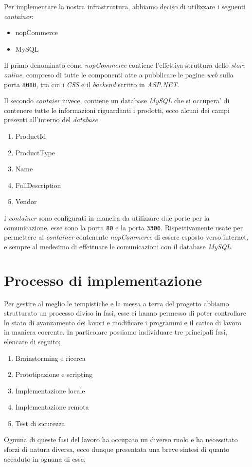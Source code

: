 \documentclass[a4paper]{report}
\begin{document}
		Per implementare la nostra infrastruttura, abbiamo deciso di utilizzare i seguenti \emph{container}:
		\begin{itemize}
			\item nopCommerce
			\item MySQL
		\end{itemize}
		Il primo denominato come \emph{nopCommerce} contiene l'effettiva struttura dello \emph{store online}, compreso
		di tutte le componenti atte a pubblicare le pagine \emph{web} sulla porta \texttt{8080}, tra cui i \emph{CSS} e
		il \emph{backend} scritto in \emph{ASP.NET}.
		
		Il secondo \emph{contaier} invece, contiene un database \emph{MySQL} che si occupera' di contenere tutte le
		informazioni riguardanti i prodotti, ecco alcuni dei campi presenti all'interno del \emph{database}
		\begin{enumerate}
			\item ProductId
			\item ProductType
			\item Name
			\item FullDescription
			\item Vendor
		\end{enumerate}

		I \emph{container} sono configurati in maneira da utilizzare due porte per la comunicazione, esse sono la porta
		\texttt{80} e la porta \texttt{3306}. Rispettivamente usate per permettere al \emph{container} contenente
		\emph{nopCommerce} di essere esposto verso internet, e sempre al medesimo di effettuare le comunicazioni con il database \emph{MySQL}.

\chapter{Processo di implementazione}
	Per gestire al meglio le tempistiche e la messa a terra del progetto abbiamo strutturato un processo diviso in fasi,
	esse ci hanno permesso di poter controllare lo stato di avanzamento dei lavori e modificare i programmi e il carico
	di lavoro in maniera coerente. In particolare possiamo individuare tre principali fasi, elencate di seguito;
	\begin{enumerate}
		\item Brainstorming e ricerca
		\item Prototipazione e scripting
		\item Implementazione locale
		\item Implementazione remota
		\item Test di sicurezza
	\end{enumerate}
	Ognuna di queste fasi del lavoro ha occupato un diverso ruolo e ha necessitato sforzi di natura diversa, ecco dunque
	presentata una breve sintesi di quanto accaduto in ognuna di esse.
\end{document}
